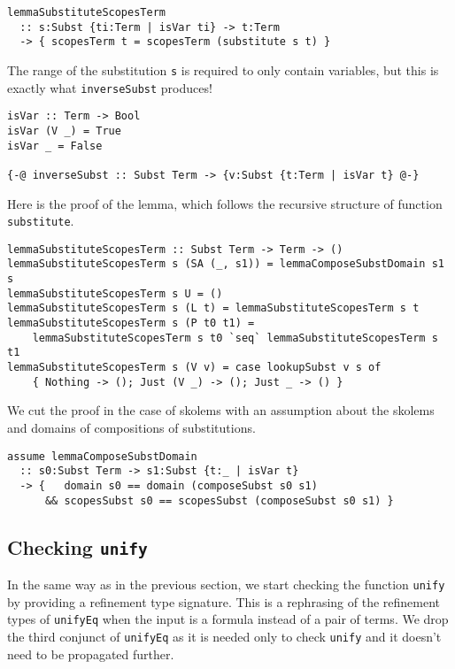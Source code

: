 \documentclass[acmtog, anonymous]{acmart}
\newcommand{\tc}[1]{{\small\texttt{#1}}}
\begin{document}
\begin{verbatim}
lemmaSubstituteScopesTerm
  :: s:Subst {ti:Term | isVar ti} -> t:Term
  -> { scopesTerm t = scopesTerm (substitute s t) }
\end{verbatim}

The range of the substitution \tc{s} is required to only contain variables, but
this is exactly what \tc{inverseSubst} produces!

\begin{verbatim}
isVar :: Term -> Bool
isVar (V _) = True
isVar _ = False

{-@ inverseSubst :: Subst Term -> {v:Subst {t:Term | isVar t} @-}
\end{verbatim}

Here is the proof of the lemma, which follows the recursive structure
of function \tc{substitute}.

\begin{verbatim}
lemmaSubstituteScopesTerm :: Subst Term -> Term -> ()
lemmaSubstituteScopesTerm s (SA (_, s1)) = lemmaComposeSubstDomain s1 s
lemmaSubstituteScopesTerm s U = ()
lemmaSubstituteScopesTerm s (L t) = lemmaSubstituteScopesTerm s t
lemmaSubstituteScopesTerm s (P t0 t1) =
    lemmaSubstituteScopesTerm s t0 `seq` lemmaSubstituteScopesTerm s t1
lemmaSubstituteScopesTerm s (V v) = case lookupSubst v s of
    { Nothing -> (); Just (V _) -> (); Just _ -> () }
\end{verbatim}

We cut the proof in the case of skolems with an assumption about the
skolems and domains of compositions of substitutions.

\begin{verbatim}
assume lemmaComposeSubstDomain
  :: s0:Subst Term -> s1:Subst {t:_ | isVar t}
  -> {   domain s0 == domain (composeSubst s0 s1)
      && scopesSubst s0 == scopesSubst (composeSubst s0 s1) }
\end{verbatim}


\subsection{Checking \tc{unify}}

In the same way as in the previous section, we start checking the function \tc{unify}
by providing a refinement type signature. This is a rephrasing of the refinement
types of \tc{unifyEq} when the input is a formula instead of a pair of terms. We
drop the third conjunct of \tc{unifyEq} as it is needed only to check \tc{unify} and
it doesn't need to be propagated further.
\end{document}
